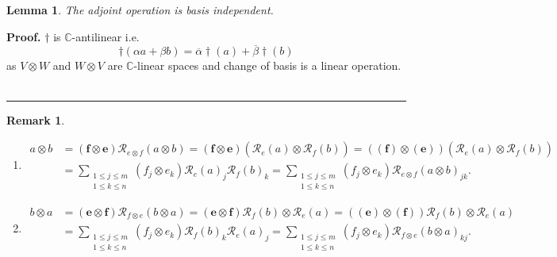 \documentclass[aps,preprint]{revtex4}%
\newtheorem{lemma}[theorem]{Lemma}
\newtheorem{remark}[theorem]{Remark}
\newenvironment{proof}[1][Proof]{\noindent\textbf{#1.} }{\ \rule{0.5em}{0.5em}}
\begin{document}
\begin{lemma}
The adjoint operation is basis independent.
\end{lemma}

\begin{proof}
$\dagger$ is $\mathbb{C}$-antilinear i.e.
\begin{equation}
\dagger\left(  \alpha a+\beta b\right)  =\overline{\alpha}\dagger\left(
a\right)  +\overline{\beta}\dagger\left(  b\right)
\end{equation}
as $V\otimes W$ and $W\otimes V$ are $\mathbb{C}$-linear spaces and change of
basis is a linear operation.
\end{proof}

\begin{remark}
\begin{enumerate}
\item
\begin{align}
a\otimes b  &  =\left(  \boldsymbol{f}\otimes\boldsymbol{e}\right)
\mathcal{R}_{e\otimes f}\left(  a\otimes b\right)  =\left(  \boldsymbol{f}%
\otimes\boldsymbol{e}\right)  \left(  \overset{}{\mathcal{R}_{e}\left(
a\right)  \otimes\mathcal{R}_{f}\left(  b\right)  }\right)  =\left(  \left(
\boldsymbol{f}\right)  \otimes\left(  \boldsymbol{e}\right)  \right)  \left(
\overset{}{\mathcal{R}_{e}\left(  a\right)  \otimes\mathcal{R}_{f}\left(
b\right)  }\right) \\
&  =\sum_{\substack{1\leq j\leq m\\1\leq k\leq n}}\left(  f_{j}\otimes
e_{k}\right)  \mathcal{R}_{e}\left(  a\right)  _{j}\mathcal{R}_{f}\left(
b\right)  _{k}=\sum_{\substack{1\leq j\leq m\\1\leq k\leq n}}\left(
f_{j}\otimes e_{k}\right)  \mathcal{R}_{e\otimes f}\left(  a\otimes b\right)
_{jk}.
\end{align}


\item
\begin{align}
b\otimes a  &  =\left(  \boldsymbol{e}\otimes\boldsymbol{f}\right)
\mathcal{R}_{f\otimes e}\left(  b\otimes a\right)  =\left(  \boldsymbol{e}%
\otimes\boldsymbol{f}\right)  \mathcal{R}_{f}\left(  b\right)  \otimes
\mathcal{R}_{e}\left(  a\right)  =\left(  \left(  \boldsymbol{e}\right)
\otimes\left(  \boldsymbol{f}\right)  \right)  \mathcal{R}_{f}\left(
b\right)  \otimes\mathcal{R}_{e}\left(  a\right) \\
&  =\sum_{\substack{1\leq j\leq m\\1\leq k\leq n}}\left(  f_{j}\otimes
e_{k}\right)  \mathcal{R}_{f}\left(  b\right)  _{k}\mathcal{R}_{e}\left(
a\right)  _{j}=\sum_{\substack{1\leq j\leq m\\1\leq k\leq n}}\left(
f_{j}\otimes e_{k}\right)  \mathcal{R}_{f\otimes e}\left(  b\otimes a\right)
_{kj}.
\end{align}



\end{enumerate}
\end{remark}
\end{document}

